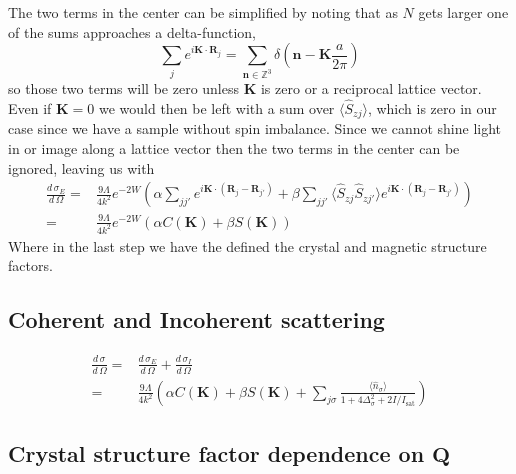 \documentclass[11pt,letter]{article}
\newcommand{\bv}[1]{\ensuremath{\mathbf{#1}}}
\newcommand{\dsig}[1]{\ensuremath{ \frac{ d\,\sigma_{#1} }{d\,\Omega} }}
\begin{document}
The two terms in the center can be simplified by noting that as $N$ gets larger one of the sums approaches a delta-function,  
\begin{equation}
\sum_{j} e^{i \bv{K} \cdot \bv{R}_{j} }  =  \sum_{\bv{n} \in \mathbb{Z}^{3} } \delta \left( \bv{n} - \bv{K}\frac{a}{2\pi} \right) 
\end{equation}
so those two terms will be zero unless $\bv{K}$ is zero or a reciprocal lattice vector.   Even if $\bv{K}=0$ we would then be left with a sum over $\langle\hat{S}_{zj}\rangle$, which is zero in our case since we have a sample without spin imbalance.   Since we cannot shine light in or image along a lattice vector then the two terms in the center can be ignored, leaving us with 
\begin{equation}
\begin{split}
\dsig{E} =&  
             \frac{9\Lambda}{4k^{2}} e^{-2W} \left(
               \alpha \sum_{ j j' }      e^{i\bv{K}\cdot(\bv{R}_{j}-\bv{R}_{j'})}
	    +  \beta \sum_{j j'} \langle \hat{S}_{zj} \hat{S}_{zj'} \rangle
            e^{i\bv{K}\cdot(\bv{R}_{j}-\bv{R}_{j'})}  \right) \\
         =&
             \frac{9\Lambda}{4k^{2}} e^{-2W} 
             \left(
               \alpha C(\bv{K})  
	    +  \beta S(\bv{K})  \right)
\end{split} 
\end{equation}
Where in the last step we have the defined the crystal and magnetic structure factors. 

\subsection{Coherent and Incoherent scattering}

\begin{equation}
\begin{split} 
\dsig{} = & \dsig{E} + \dsig{I}  \\
        = &\frac{9\Lambda}{4k^{2}} 
          \left(
               \alpha C(\bv{K})  
	    +  \beta S(\bv{K}) 
            +  \sum_{j\sigma}
                     \frac{\langle \hat{n}_{\sigma} \rangle}{1+ 4\Delta_{\sigma}^{2} + 2 I / I_{\mathrm{sat}} } 
          \right)
\end{split}
\end{equation}
 
\subsection{ Crystal structure factor dependence on \bv{Q}}
\end{document}
